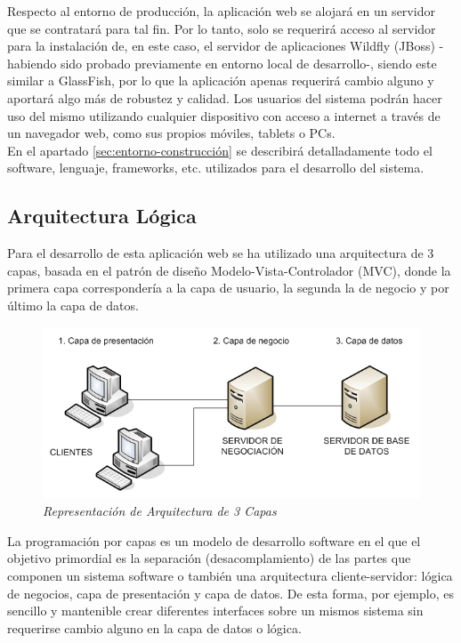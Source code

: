 Respecto al entorno de producción, la aplicación web se alojará en un servidor que se contratará para tal fin. Por lo tanto, solo se requerirá acceso al servidor para la instalación de, en este caso, el servidor de aplicaciones Wildfly (JBoss) -habiendo sido probado previamente en entorno local de desarrollo-, siendo este similar a GlassFish, por lo que la aplicación apenas requerirá cambio alguno y aportará algo más de robustez y calidad. Los usuarios del sistema podrán hacer uso del mismo utilizando cualquier dispositivo con acceso a internet a través de un navegador web, como sus propios móviles, tablets o PCs. \\

En el apartado \ref{sec:entorno-construcción} se describirá detalladamente todo el software, lenguaje, frameworks, etc. utilizados para el desarrollo del sistema.


\subsection{Arquitectura Lógica} \label{sec:arquitectura-logica}

Para el desarrollo de esta aplicación web se ha utilizado una arquitectura de 3 capas, basada en el patrón de diseño Modelo-Vista-Controlador (MVC), donde la primera capa correspondería a la capa de usuario, la segunda la de negocio y por último la capa de datos.

\vspace{10mm}

\begin{figure}[H]
\centering
  \includegraphics[scale=.55]{img/arquitectura-tres-capas.jpg}
  \caption{\textit{Representación de Arquitectura de 3 Capas}}
  \label{fig:arquitectura-tres-capas}
\end{figure}

\vspace{10mm}

La programación por capas es un modelo de desarrollo software en el que el objetivo primordial es la separación (desacomplamiento) de las partes que componen un sistema software o también una arquitectura cliente-servidor: lógica de negocios, capa de presentación y capa de datos. De esta forma, por ejemplo, es sencillo y mantenible crear diferentes interfaces sobre un mismos sistema sin requerirse cambio alguno en la capa de datos o lógica.\\

